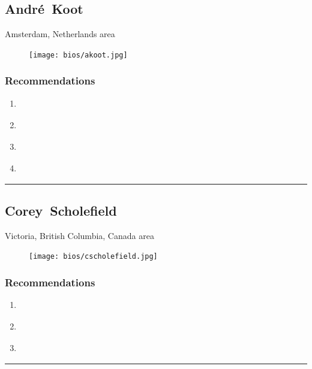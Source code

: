 \subsection{André~Koot} \textsf{Amsterdam, Netherlands area} \par \setlength{\columnsep}{0pt} \begin{figure} \centering \texttt{[image: bios/akoot.jpg]} \end{figure} \textsf{  } \WFclear \subsubsection{Recommendations}\begin{enumerate}
\item \cite{Cameron2005}
\item \cite{Hardt2005}
\item \cite{Harper2006}
\item \cite{Williamson2017}
\end{enumerate}\noindent\rule{\textwidth}{0.2pt}

\subsection{Corey~Scholefield} \textsf{Victoria, British Columbia, Canada area} \par \setlength{\columnsep}{0pt} \begin{figure} \centering \texttt{[image: bios/cscholefield.jpg]} \end{figure} \textsf{  } \WFclear \subsubsection{Recommendations}\begin{enumerate}
\item \cite{Hazelton2015}
\item \cite{Prasad2012}
\item \cite{Windley2005}
\end{enumerate}\noindent\rule{\textwidth}{0.2pt}

